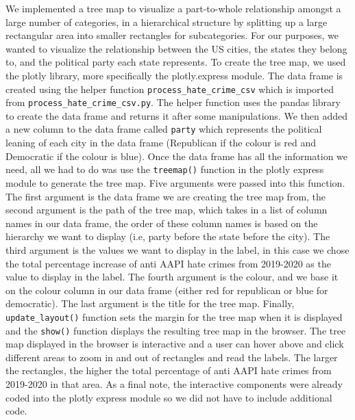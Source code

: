 \documentclass[fontsize=11pt]{article}
\begin{document}
    \quad We implemented a tree map to visualize a part-to-whole relationship amongst a large number of categories, in a hierarchical structure by splitting up a large rectangular area into smaller rectangles for subcategories. For our purposes, we wanted to visualize the relationship between the US cities, the states they belong to, and the political party each state represents. To create the tree map, we used the  plotly library, more specifically the plotly.express module. The data frame is created using the helper function \texttt{process\_hate\_crime\_csv} which is imported from \texttt{process\_hate\_crime\_csv.py}. The helper function uses the pandas library to create the data frame and returns it after some manipulations. We then added a new column to the data frame called \texttt{party} which represents the political leaning of each city in the data frame (Republican if the colour is red and Democratic if the colour is blue). Once the data frame has all the information we need, all we had to do was use the \texttt{treemap()} function in the plotly express module to generate the tree map. Five arguments were passed into this function. The first argument is the data frame we are creating the tree map from, the second argument is the path of the tree map, which takes in a list of column names in our data frame, the order of these column names is based on the hierarchy we want to display (i.e, party before the state before the city). The third argument is the values we want to display in the label, in this case we chose the total percentage increase of anti AAPI hate crimes from 2019-2020 as the value to display in the label. The fourth argument is the colour, and we base it on the colour column in our data frame (either red for republican or blue for democratic). The last argument is the title for the tree map. Finally, \texttt{update\_layout()} function sets the margin for the tree map when it is displayed and the \texttt{show()} function displays the resulting tree map in the browser. The tree map displayed in the browser is interactive and a user can hover above and click different areas to zoom in and out of rectangles and read the labels. The larger the rectangles, the higher the total percentage of anti AAPI hate crimes from 2019-2020 in that area. As a final note, the interactive components were already coded into the plotly express module so we did not have to include additional code.\\
\end{document}
